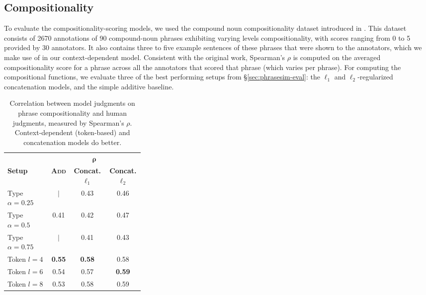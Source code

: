 \documentclass[11pt]{article}
\begin{document}
\subsection{Compositionality}
\label{sec:compo-eval}

To evaluate the compositionality-scoring models, we used the compound noun compositionality dataset introduced in .  
This dataset consists of 2670 annotations of 90 compound-noun phrases exhibiting varying levels compositionality, with scores ranging from 0 to 5 provided by 30 annotators. 
It also contains three to five example sentences of these phrases that were shown to the annotators, which we make use of in our context-dependent model. 
Consistent with the original work, Spearman's $\rho$ is computed on the averaged compositionality score for a phrase across all the annotators that scored that phrase (which varies per phrase). 
For computing the compositional functions, we evaluate three of the best performing setups from \S\ref{sec:phrasesim-eval}: the $\ell_1$ and $\ell_2$-regularized concatenation models, and the simple additive baseline. 

\begin{table}[h!]
	\small
  \begin{center}
    \begin{tabular}{p{0.32\linewidth}ccc}
      \hline
      & \multicolumn{3}{c}{$\bm{\rho}$} \\
	  {\bf Setup} & {\bf \textsc{Add}} & {\bf Concat. $\ell_1$} & {\bf Concat. $\ell_2$} \\
	  \hline
      Type $\alpha=0.25$ & $\mid$ & 0.43 & 0.46 \\
	  Type $\alpha=0.5$ &  0.41 & 0.42 & 0.47 \\
	  Type $\alpha=0.75$ & $\mid$ & 0.41 & 0.43 \\
	  \hline 
	  Token $l=4$ & {\bf 0.55} & {\bf 0.58} & 0.58 \\
      Token $l=6$ & 0.54 & 0.57 & {\bf 0.59} \\
	  Token $l=8$  & 0.53 & 0.58 & 0.59 \\
	\end{tabular}
  \end{center}
  \caption{Correlation between model judgments on phrase compositionality and human judgments, measured by Spearman's $\rho$. Context-dependent (token-based) and concatenation models do better.}
  \label{tab:comp-results}
\end{table}
\end{document}
